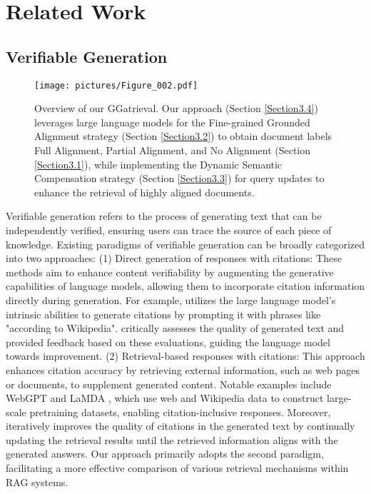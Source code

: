 \section{Related Work}
\subsection{Verifiable Generation}

\begin{figure*}[t]
  \centering %
  \texttt{[image: pictures/Figure\_002.pdf]} %
  \caption{Overview of our GGatrieval. Our approach (Section \ref{Section3.4}) leverages large language models for the Fine-grained Grounded Alignment strategy (Section \ref{Section3.2}) to obtain document labels {Full Alignment, Partial Alignment, and No Alignment} (Section \ref{Section3.1}), while implementing the Dynamic Semantic Compensation strategy (Section \ref{Section3.3}) for query updates to enhance the retrieval of highly aligned documents.}
  \label{fig:figure_2} %
\end{figure*}

Verifiable generation refers to the process of generating text that can be independently verified, ensuring users can trace the source of each piece of knowledge. Existing paradigms of verifiable generation can be broadly categorized into two approaches: (1) Direct generation of responses with citations: These methods aim to enhance content verifiability by augmenting the generative capabilities of language models, allowing them to incorporate citation information directly during generation. For example, \citet{weller-etal-2024-according} utilizes the large language model's intrinsic abilities to generate citations by prompting it with phrases like "according to Wikipedia". \citet{ref22} critically assesses the quality of generated text and provided feedback based on these evaluations, guiding the language model towards improvement. (2) Retrieval-based responses with citations: This approach enhances citation accuracy by retrieving external information, such as web pages or documents, to supplement generated content. Notable examples include WebGPT \citep{ref26} and LaMDA \citep{ref28}, which use web and Wikipedia data to construct large-scale pretraining datasets, enabling citation-inclusive responses. Moreover, \citet{li-etal-2024-llatrieval} iteratively improves the quality of citations in the generated text by continually updating the retrieval results until the retrieved information aligns with the generated answers. Our approach primarily adopts the second paradigm, facilitating a more effective comparison of various retrieval mechanisms within RAG systems.

